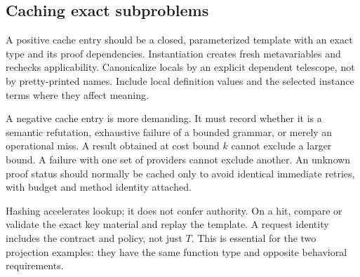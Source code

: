 \subsection{Caching exact subproblems}

A positive cache entry should be a closed, parameterized template with an exact
type and its proof dependencies. Instantiation creates fresh metavariables and
rechecks applicability. Canonicalize locals by an explicit dependent telescope,
not by pretty-printed names. Include local definition values and the selected
instance terms where they affect meaning.

A negative cache entry is more demanding. It must record whether it is a
semantic refutation, exhaustive failure of a bounded grammar, or merely an
operational miss. A result obtained at cost bound $k$ cannot exclude a larger
bound. A failure with one set of providers cannot exclude another. An unknown
proof status should normally be cached only to avoid identical immediate
retries, with budget and method identity attached.

Hashing accelerates lookup; it does not confer authority. On a hit, compare or
validate the exact key material and replay the template. A request identity
includes the contract and policy, not just $T$. This is essential for the two
projection examples: they have the same function type and opposite behavioral
requirements.
